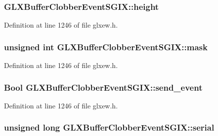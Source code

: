 \hypertarget{struct_g_l_x_buffer_clobber_event_s_g_i_x_a7838dbabb76c22aa8241310a3f2363ea}{
\subsubsection[{height}]{ G\-L\-X\-Buffer\-Clobber\-Event\-S\-G\-I\-X\-::height}}\label{struct_g_l_x_buffer_clobber_event_s_g_i_x_a7838dbabb76c22aa8241310a3f2363ea}


Definition at line 1246 of file glxew.\-h.

\hypertarget{struct_g_l_x_buffer_clobber_event_s_g_i_x_a74b4ad1ad3cac011001151411f621da1}{
\subsubsection[{mask}]{\setlength{\rightskip}{0pt plus 5cm}unsigned {\bf int} G\-L\-X\-Buffer\-Clobber\-Event\-S\-G\-I\-X\-::mask}}\label{struct_g_l_x_buffer_clobber_event_s_g_i_x_a74b4ad1ad3cac011001151411f621da1}


Definition at line 1246 of file glxew.\-h.

\hypertarget{struct_g_l_x_buffer_clobber_event_s_g_i_x_af43bf0edbe40a74ef58dfb546a75118b}{
\subsubsection[{send\-\_\-event}]{\setlength{\rightskip}{0pt plus 5cm}Bool G\-L\-X\-Buffer\-Clobber\-Event\-S\-G\-I\-X\-::send\-\_\-event}}\label{struct_g_l_x_buffer_clobber_event_s_g_i_x_af43bf0edbe40a74ef58dfb546a75118b}


Definition at line 1246 of file glxew.\-h.

\hypertarget{struct_g_l_x_buffer_clobber_event_s_g_i_x_ac295e3276a7986eeae4d6a2a28c7e0b7}{
\subsubsection[{serial}]{\setlength{\rightskip}{0pt plus 5cm}unsigned long G\-L\-X\-Buffer\-Clobber\-Event\-S\-G\-I\-X\-::serial}}\label{struct_g_l_x_buffer_clobber_event_s_g_i_x_ac295e3276a7986eeae4d6a2a28c7e0b7}


